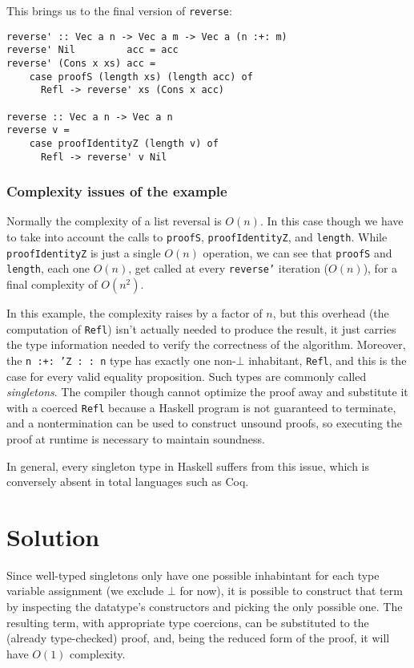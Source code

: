 This brings us to the final version of \texttt{reverse}:

\begin{lstlisting}[caption=Length-indexed vector reversal]
reverse' :: Vec a n -> Vec a m -> Vec a (n :+: m)
reverse' Nil         acc = acc
reverse' (Cons x xs) acc =
    case proofS (length xs) (length acc) of
      Refl -> reverse' xs (Cons x acc)

reverse :: Vec a n -> Vec a n
reverse v =
    case proofIdentityZ (length v) of
      Refl -> reverse' v Nil
\end{lstlisting}

\subsection{Complexity issues of the example}
\label{subsec:complexity-issues}

Normally the complexity of a list reversal is $O(n)$.
In this case though we have to take into account the calls to \texttt{proofS}, \texttt{proofIdentityZ}, and \texttt{length}.
While \texttt{proofIdentityZ} is just a single $O(n)$ operation, we can see that \texttt{proofS} and \texttt{length}, each one $O(n)$, get called at every \texttt{reverse'} iteration ($O(n)$), for a final complexity of $O(n^2)$.

In this example, the complexity raises by a factor of $n$, but this overhead (the computation of \texttt{Refl}) isn't actually needed to produce the result, it just carries the type information needed to verify the correctness of the algorithm.
Moreover, the \texttt{n :+: 'Z :~: n} type has exactly one non-$\bot$ inhabitant, \texttt{Refl}, and this is the case for every valid equality proposition. Such types are commonly called \emph{singletons}.
The compiler though cannot optimize the proof away and substitute it with a coerced \texttt{Refl} because a Haskell program is not guaranteed to terminate, and a nontermination can be used to construct unsound proofs, so executing the proof at runtime is necessary to maintain soundness.

In general, every singleton type in Haskell suffers from this issue, which is conversely absent in total languages such as Coq.

\chapter{Solution}
\label{sec:solution}

Since well-typed singletons only have one possible inhabintant for each type variable assignment (we exclude $\bot$ for now), it is possible to construct that term by inspecting the datatype's constructors and picking the only possible one.
The resulting term, with appropriate type coercions, can be substituted to the (already type-checked) proof, and, being the reduced form of the proof, it will have $O(1)$ complexity.

